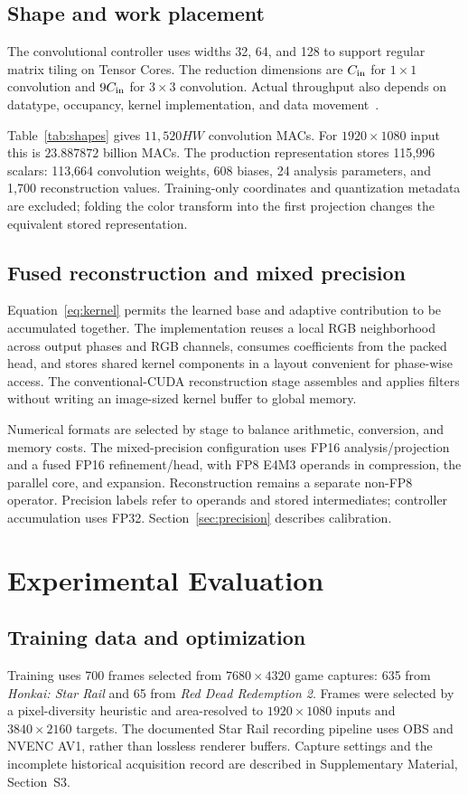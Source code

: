 \documentclass[10pt,twocolumn,letterpaper]{article}
\begin{document}
\subsection{Shape and work placement}
The convolutional controller uses widths 32, 64, and 128 to support regular matrix tiling on Tensor Cores.
The reduction dimensions are $C_{\rm in}$ for $1\times1$ convolution and $9C_{\rm in}$ for $3\times3$ convolution.
Actual throughput also depends on datatype, occupancy, kernel implementation, and data movement~\cite{nvidia2023gemm}.

Table~\ref{tab:shapes} gives $11{,}520HW$ convolution MACs.
For $1920\times1080$ input this is $23.887872$ billion MACs.
The production representation stores 115,996 scalars: 113,664 convolution weights, 608 biases, 24 analysis parameters, and 1,700 reconstruction values.
Training-only coordinates and quantization metadata are excluded; folding the color transform into the first projection changes the equivalent stored representation.

\subsection{Fused reconstruction and mixed precision}
Equation~\eqref{eq:kernel} permits the learned base and adaptive contribution to be accumulated together.
The implementation reuses a local RGB neighborhood across output phases and RGB channels, consumes coefficients from the packed head, and stores shared kernel components in a layout convenient for phase-wise access.
The conventional-CUDA reconstruction stage assembles and applies filters without writing an image-sized kernel buffer to global memory.

Numerical formats are selected by stage to balance arithmetic, conversion, and memory costs.
The mixed-precision configuration uses FP16 analysis/projection and a fused FP16 refinement/head, with FP8 E4M3 operands in compression, the parallel core, and expansion.
Reconstruction remains a separate non-FP8 operator.
Precision labels refer to operands and stored intermediates; controller accumulation uses FP32.
Section~\ref{sec:precision} describes calibration.

\section{Experimental Evaluation}
\label{sec:eval}
\subsection{Training data and optimization}
\label{sec:data}
Training uses 700 frames selected from $7680\times4320$ game captures: 635 from \emph{Honkai: Star Rail} and 65 from \emph{Red Dead Redemption 2}.
Frames were selected by a pixel-diversity heuristic and area-resolved to $1920\times1080$ inputs and $3840\times2160$ targets.
The documented Star Rail recording pipeline uses OBS and NVENC AV1, rather than lossless renderer buffers.
Capture settings and the incomplete historical acquisition record are described in Supplementary Material, Section~S3.
\end{document}
